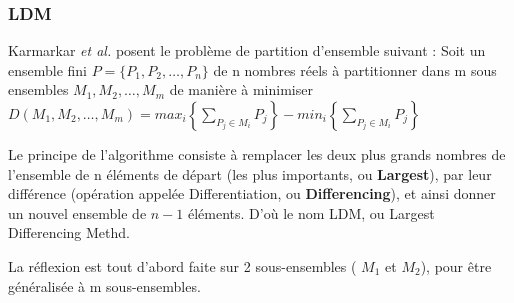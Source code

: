 \documentclass[a4paper,12pt]{report}
\theoremstyle{plain}				%
\theoremstyle{definition}				%
\begin{document}
\subsubsection{LDM}


Karmarkar \emph{et al.} \cite{karmarkar1982differencing} posent le problème de partition d'ensemble suivant :
Soit un ensemble fini $P=\{P_1, P_2, \ldots, P_n\}$ de 
n nombres réels 
à partitionner dans m sous ensembles $M_1, M_2, \ldots, M_m$ 
de manière à minimiser 
$D(M_1, M_2, \ldots, M_m) = max_i \left\{ \sum_{P_j \in M_i}P_j \right\} - min_i \left\{ \sum_{P_j \in M_i}P_j \right\}$  

Le principe de l'algorithme consiste à remplacer les deux plus grands nombres de l'ensemble de n éléments de départ 
(les plus importants, ou \textbf{Largest}), 
par leur différence 
(opération appelée Differentiation, ou \textbf{Differencing}), 
et ainsi donner un nouvel ensemble de $n-1$ éléments. 
D'où le nom LDM, ou Largest Differencing Methd.


La réflexion est tout d'abord faite sur 2 sous-ensembles ( $M_1$ et $M_2$), pour être généralisée à m sous-ensembles.
\end{document}
